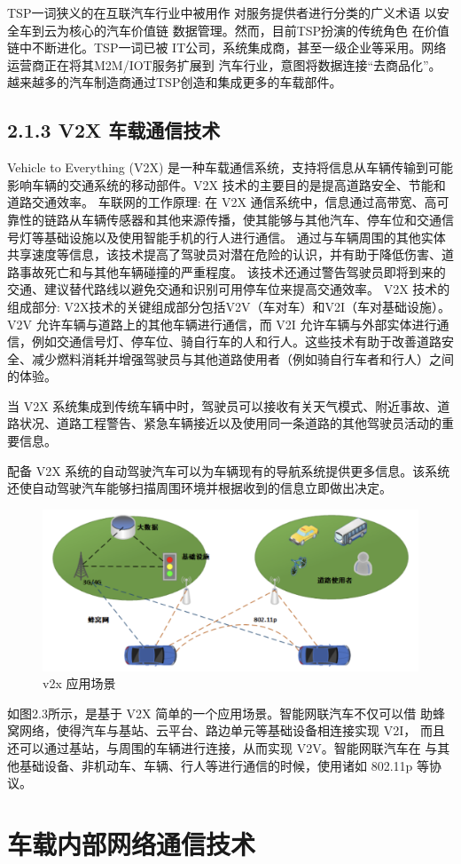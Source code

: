 TSP一词狭义的在互联汽车行业中被用作
对服务提供者进行分类的广义术语
以安全车到云为核心的汽车价值链
数据管理。然而，目前TSP扮演的传统角色
在价值链中不断进化。TSP一词已被
IT公司，系统集成商，甚至一级企业等采用。网络
运营商正在将其M2M/IOT服务扩展到
汽车行业，意图将数据连接“去商品化”。
越来越多的汽车制造商通过TSP创造和集成更多的车载部件。

\subsection*{2.1.3 V2X 车载通信技术}

Vehicle to Everything (V2X) 是一种车载通信系统，支持将信息从车辆传输到可能影响车辆的交通系统的移动部件。V2X 技术的主要目的是提高道路安全、节能和道路交通效率。
\newline
车联网的工作原理: 在 V2X 通信系统中，信息通过高带宽、高可靠性的链路从车辆传感器和其他来源传播，使其能够与其他汽车、停车位和交通信号灯等基础设施以及使用智能手机的行人进行通信。
通过与车辆周围的其他实体共享速度等信息，该技术提高了驾驶员对潜在危险的认识，并有助于降低伤害、道路事故死亡和与其他车辆碰撞的严重程度。
该技术还通过警告驾驶员即将到来的交通、建议替代路线以避免交通和识别可用停车位来提高交通效率。
\newline
V2X 技术的组成部分:
V2X技术的关键组成部分包括V2V（车对车）和V2I（车对基础设施）。V2V 允许车辆与道路上的其他车辆进行通信，而 V2I 允许车辆与外部实体进行通信，例如交通信号灯、停车位、骑自行车的人和行人。这些技术有助于改善道路安全、减少燃料消耗并增强驾驶员与其他道路使用者（例如骑自行车者和行人）之间的体验。

当 V2X 系统集成到传统车辆中时，驾驶员可以接收有关天气模式、附近事故、道路状况、道路工程警告、紧急车辆接近以及使用同一条道路的其他驾驶员活动的重要信息。

配备 V2X 系统的自动驾驶汽车可以为车辆现有的导航系统提供更多信息。该系统还使自动驾驶汽车能够扫描周围环境并根据收到的信息立即做出决定。
\begin{figure}
    \centering
    \includegraphics[scale=0.6]{resources/img/i3.png}
    \caption{v2x 应用场景}
  \end{figure}
\newline
如图2.3所示，是基于 V2X 简单的一个应用场景。智能网联汽车不仅可以借
助蜂窝网络，使得汽车与基站、云平台、路边单元等基础设备相连接实现 V2I，
而且还可以通过基站，与周围的车辆进行连接，从而实现 V2V。智能网联汽车在
与其他基础设备、非机动车、车辆、行人等进行通信的时候，使用诸如 802.11p
等协议。

\section*{车载内部网络通信技术}